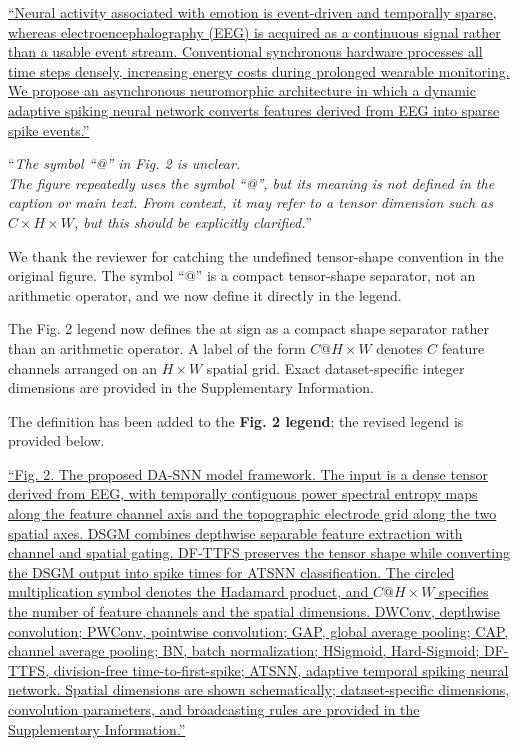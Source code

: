 \documentclass[12pt,technote,onecolumn]{IEEEtran}
\begin{document}
\uline{``Neural activity associated with emotion is event-driven and temporally sparse, whereas electroencephalography (EEG) is acquired as a continuous signal rather than a usable event stream. Conventional synchronous hardware processes all time steps densely, increasing energy costs during prolonged wearable monitoring. We propose an asynchronous neuromorphic architecture in which a dynamic adaptive spiking neural network converts features derived from EEG into sparse spike events.''}


\vspace{4mm}

``{\it The symbol ``@'' in Fig. 2 is unclear.\\
The figure repeatedly uses the symbol ``@'', but its meaning is not
defined in the caption or main text. From context, it may refer to a
tensor dimension such as \(C \times H \times W\), but this should be
explicitly clarified.}''
\vspace{1mm}


We thank the reviewer for catching the undefined tensor-shape convention in the original figure. The symbol ``@'' is a compact tensor-shape separator, not an arithmetic operator, and we now define it directly in the legend.

The Fig. 2 legend now defines the at sign as a compact shape separator
rather than an arithmetic operator. A label of the form \(C@H\times W\)
denotes \(C\) feature channels arranged on an \(H\times W\) spatial
grid. Exact dataset-specific integer dimensions are provided in the
Supplementary Information.



The definition has been added to the \textbf{Fig. 2 legend}; the revised legend is provided below.

\uline{``Fig. 2. The proposed DA-SNN model framework. The input is a dense tensor derived from EEG, with temporally contiguous power spectral entropy maps along the feature channel axis and the topographic electrode grid along the two spatial axes. DSGM combines depthwise separable feature extraction with channel and spatial gating. DF-TTFS preserves the tensor shape while converting the DSGM output into spike times for ATSNN classification. The circled multiplication symbol denotes the Hadamard product, and $C@H\times W$ specifies the number of feature channels and the spatial dimensions. DWConv, depthwise convolution; PWConv, pointwise convolution; GAP, global average pooling; CAP, channel average pooling; BN, batch normalization; HSigmoid, Hard-Sigmoid; DF-TTFS, division-free time-to-first-spike; ATSNN, adaptive temporal spiking neural network. Spatial dimensions are shown schematically; dataset-specific dimensions, convolution parameters, and broadcasting rules are provided in the Supplementary Information.''}
\EvidenceMainFigTwo
\vspace{4mm}
\end{document}

